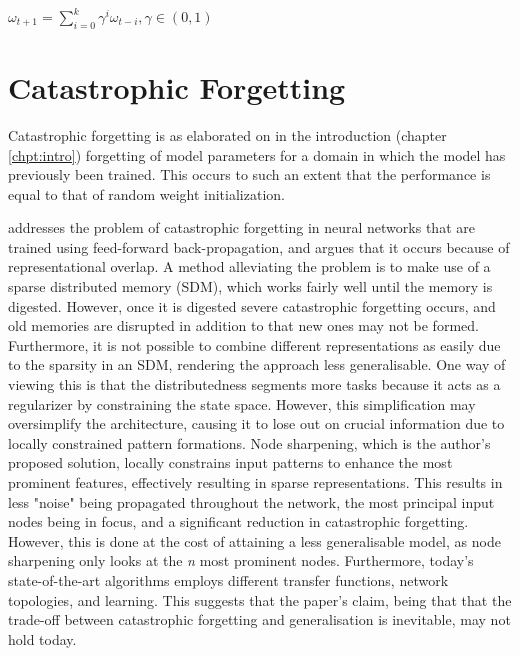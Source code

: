\begin{center}
\begin{math}
    \omega_{t+1} = \sum_{i=0}^{k}\gamma^i \omega_{t-i},
    \gamma \in (0, 1)
\end{math}
\end{center}


\section{Catastrophic Forgetting}

Catastrophic forgetting \citep{McCloskey1989, Ratcliff1990} is as elaborated on in the introduction (chapter \ref{chpt:intro}) forgetting of model parameters for a domain in which the model has previously been trained. This occurs to such an extent that the performance is equal to that of random weight initialization.

\cite{French1992} addresses the problem of catastrophic forgetting in neural networks that are trained using feed-forward back-propagation, and argues that it occurs because of representational overlap. A method alleviating the problem is to make use of a sparse distributed memory (SDM), which works fairly well until the memory is digested. However, once it is digested severe catastrophic forgetting occurs, and old memories are disrupted in addition to that new ones may not be formed. Furthermore, it is not possible to combine different representations as easily due to the sparsity in an SDM, rendering the approach less generalisable. One way of viewing this is that the distributedness segments more tasks because it acts as a regularizer by constraining the state space. However, this simplification may oversimplify the architecture, causing it to lose out on crucial information due to locally constrained pattern formations. Node sharpening, which is the author's proposed solution, locally constrains input patterns to enhance the most prominent features, effectively resulting in sparse representations. This results in less "noise" being propagated throughout the network, the most principal input nodes being in focus, and a significant reduction in catastrophic forgetting. However, this is done at the cost of attaining a less generalisable model, as node sharpening only looks at the \textit{n} most prominent nodes. Furthermore, today's state-of-the-art algorithms employs different transfer functions, network topologies, and learning. This suggests that the paper's claim, being that that the trade-off between catastrophic forgetting and generalisation is inevitable, may not hold today.

